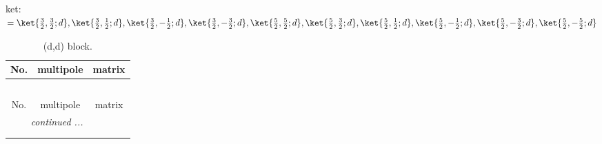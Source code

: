\documentclass[fleqn,8pt,landscape]{jsarticle}
\begin{document}
\noindent
ket: $=\ket{\frac{3}{2},\frac{3}{2};d}, \ket{\frac{3}{2},\frac{1}{2};d}, \ket{\frac{3}{2},- \frac{1}{2};d}, \ket{\frac{3}{2},- \frac{3}{2};d}, \ket{\frac{5}{2},\frac{5}{2};d}, \ket{\frac{5}{2},\frac{3}{2};d}, \ket{\frac{5}{2},\frac{1}{2};d}, \ket{\frac{5}{2},- \frac{1}{2};d}, \ket{\frac{5}{2},- \frac{3}{2};d}, \ket{\frac{5}{2},- \frac{5}{2};d}$
\renewcommand{\arraystretch}{1.6}
\begin{longtable}{ccc}
\caption{(d,d) block.}
 \\
 \hline \hline
No. & multipole & matrix \\ \hline \endfirsthead

\multicolumn{2}{l}{\tablename\ \thetable{}} \\
 \hline \hline
No. & multipole & matrix \\ \hline \endhead

 \hline \hline
\multicolumn{2}{r}{\footnotesize\it continued ...} \\ \endfoot

 \hline \hline
\multicolumn{2}{r}{} \\ \endlastfoot


\end{longtable}
\end{document}

